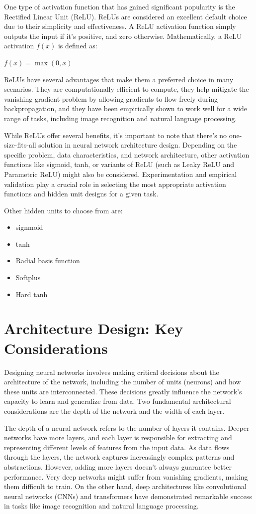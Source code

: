 \documentclass{report}
\begin{document}
One type of activation function that has gained significant popularity is the Rectified Linear Unit (ReLU). ReLUs are considered an excellent default choice due to their simplicity and effectiveness. A ReLU activation function simply outputs the input if it's positive, and zero otherwise. Mathematically, a ReLU activation \(f(x)\) is defined as:

$f(x) = \max(0, x)$

ReLUs have several advantages that make them a preferred choice in many scenarios. They are computationally efficient to compute, they help mitigate the vanishing gradient problem by allowing gradients to flow freely during backpropagation, and they have been empirically shown to work well for a wide range of tasks, including image recognition and natural language processing.

While ReLUs offer several benefits, it's important to note that there's no one-size-fits-all solution in neural network architecture design. Depending on the specific problem, data characteristics, and network architecture, other activation functions like sigmoid, tanh, or variants of ReLU (such as Leaky ReLU and Parametric ReLU) might also be considered. Experimentation and empirical validation play a crucial role in selecting the most appropriate activation functions and hidden unit designs for a given task.

Other hidden units to choose from are:
\begin{itemize}
	\item signmoid
	\item tanh
	\item Radial basis function
	\item Softplus
	\item Hard tanh
\end{itemize}

\section{Architecture Design: Key Considerations}

Designing neural networks involves making critical decisions about the architecture of the network, including the number of units (neurons) and how these units are interconnected. These decisions greatly influence the network's capacity to learn and generalize from data. Two fundamental architectural considerations are the depth of the network and the width of each layer.

The depth of a neural network refers to the number of layers it contains. Deeper networks have more layers, and each layer is responsible for extracting and representing different levels of features from the input data. As data flows through the layers, the network captures increasingly complex patterns and abstractions. However, adding more layers doesn't always guarantee better performance. Very deep networks might suffer from vanishing gradients, making them difficult to train. On the other hand, deep architectures like convolutional neural networks (CNNs) and transformers have demonstrated remarkable success in tasks like image recognition and natural language processing.
\end{document}
